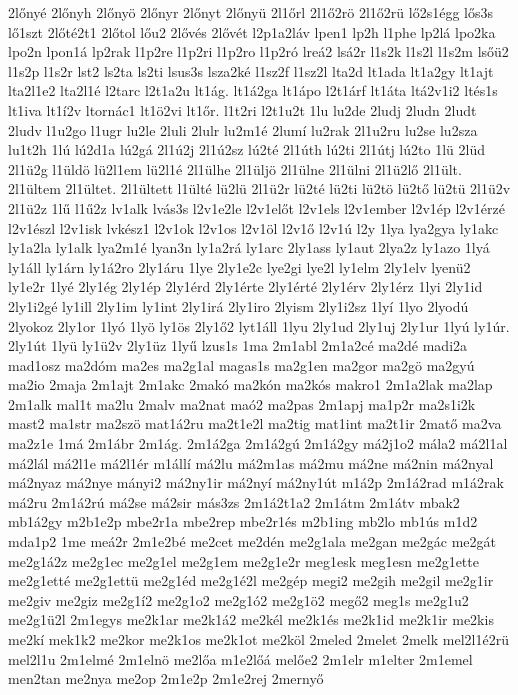 {2lőnyé
2lőnyh
2lőnyö
2lőnyr
2lőnyt
2lőnyü
2l1őrl
2l1ő2rö
2l1ő2rü
lő2s1égg
lős3s
lő1szt
2lőté2t1
2lőtol
lőu2
2lővés
2lővét
l2p1a2láv
lpen1
lp2h
l1phe
lp2lá
lpo2ka
lpo2n
lpon1á
lp2rak
l1p2re
l1p2ri
l1p2ro
l1p2ró
lreá2
lsá2r
l1s2k
l1s2l
l1s2m
lsőü2
l1s2p
l1s2r
lst2
ls2ta
ls2ti
lsus3s
lsza2ké
l1sz2f
l1sz2l
lta2d
lt1ada
lt1a2gy
lt1ajt
lta2l1e2
lta2l1é
l2tarc
l2t1a2u
lt1ág.
lt1á2ga
lt1ápo
l2t1árf
lt1áta
ltá2v1i2
ltés1s
lt1iva
lt1í2v
ltornác1
lt1ö2vi
lt1őr.
l1t2ri
l2t1u2t
1lu
lu2de
2ludj
2ludn
2ludt
2ludv
l1u2go
l1ugr
lu2le
2luli
2lulr
lu2m1é
2lumí
lu2rak
2l1u2ru
lu2se
lu2sza
lu1t2h
1lú
lú2d1a
lú2gá
2l1ú2j
2l1ú2sz
lú2té
2l1úth
lú2ti
2l1útj
lú2to
1lü
2lüd
2l1ü2g
l1üldö
lü2l1em
lü2l1é
2l1ülhe
2l1üljö
2l1ülne
2l1ülni
2l1ü2lő
2l1ült.
2l1ültem
2l1ültet.
2l1ültett
l1ülté
lü2lü
2l1ü2r
lü2té
lü2ti
lü2tö
lü2tő
lü2tü
2l1ü2v
2l1ü2z
1lű
l1ű2z
lv1alk
lvás3s
l2v1e2le
l2v1előt
l2v1els
l2v1ember
l2v1ép
l2v1érzé
l2v1észl
l2v1isk
lvkész1
l2v1ok
l2v1os
l2v1öl
l2v1ő
l2v1ú
l2y
1lya
lya2gya
ly1akc
ly1a2la
ly1alk
lya2m1é
lyan3n
ly1a2rá
ly1arc
2ly1ass
ly1aut
2lya2z
ly1azo
1lyá
ly1áll
ly1árn
ly1á2ro
2ly1áru
1lye
2ly1e2c
lye2gi
lye2l
ly1elm
2ly1elv
lyenü2
ly1e2r
1lyé
2ly1ég
2ly1ép
2ly1érd
2ly1érte
2ly1érté
2ly1érv
2ly1érz
1lyi
2ly1id
2ly1i2gé
ly1ill
2ly1im
ly1int
2ly1irá
2ly1iro
2lyism
2ly1i2sz
1lyí
1lyo
2lyodú
2lyokoz
2ly1or
1lyó
1lyö
ly1ös
2ly1ő2
lyt1áll
1lyu
2ly1ud
2ly1uj
2ly1ur
1lyú
ly1úr.
2ly1út
1lyü
ly1ü2v
2ly1üz
1lyű
lzus1s
1ma
2m1abl
2m1a2cé
ma2dé
madi2a
mad1osz
ma2dóm
ma2es
ma2g1al
magas1s
ma2g1en
ma2gor
ma2gö
ma2gyú
ma2io
2maja
2m1ajt
2m1akc
2makó
ma2kón
ma2kós
makro1
2m1a2lak
ma2lap
2m1alk
mal1t
ma2lu
2malv
ma2nat
maó2
ma2pas
2m1apj
ma1p2r
ma2s1i2k
mast2
ma1str
ma2szö
mat1á2ru
ma2t1e2l
ma2tig
mat1int
ma2t1ir
2matő
ma2va
ma2z1e
1má
2m1ábr
2m1ág.
2m1á2ga
2m1á2gú
2m1á2gy
má2j1o2
mála2
má2l1al
má2lál
má2l1e
má2l1ér
m1állí
má2lu
má2m1as
má2mu
má2ne
má2nin
má2nyal
má2nyaz
má2nye
mányi2
má2ny1ir
má2nyí
má2ny1út
m1á2p
2m1á2rad
m1á2rak
má2ru
2m1á2rú
má2se
má2sir
más3zs
2m1á2t1a2
2m1átm
2m1átv
mbak2
mb1á2gy
m2b1e2p
mbe2r1a
mbe2rep
mbe2r1és
m2b1ing
mb2lo
mb1ús
m1d2
mda1p2
1me
meá2r
2m1e2bé
me2cet
me2dén
me2g1ala
me2gan
me2gác
me2gát
me2g1á2z
me2g1ec
me2g1el
me2g1em
me2g1e2r
meg1esk
meg1esn
me2g1ette
me2g1etté
me2g1ettü
me2g1éd
me2g1é2l
me2gép
megi2
me2gih
me2gil
me2g1ir
me2giv
me2giz
me2g1í2
me2g1o2
me2g1ó2
me2g1ö2
megő2
meg1s
me2g1u2
me2g1ü2l
2m1egys
me2k1ar
me2k1á2
me2kél
me2k1és
me2k1id
me2k1ir
me2kis
me2kí
mek1k2
me2kor
me2k1os
me2k1ot
me2köl
2meled
2melet
2melk
mel2l1é2rü
mel2l1u
2m1elmé
2m1elnö
me2lőa
m1e2lőá
melőe2
2m1elr
m1elter
2m1emel
men2tan
me2nya
me2op
2m1e2p
2m1e2rej
2mernyő
}

